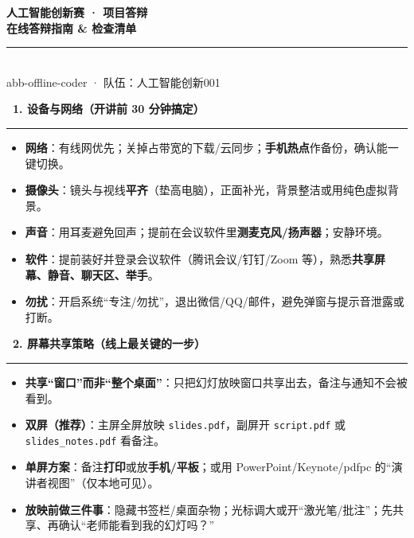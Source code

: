 \documentclass[a4paper,11pt,fontset=none]{ctexart}
\newcommand{\sect}[1]{\par\vspace{7pt}\noindent
  {\sffamily\bfseries\large\color{abbdark}\ding{110}\ #1}\\[-3pt]
  {\color{abbred}\rule{\linewidth}{0.8pt}}\par\vspace{3pt}}
\begin{document}
\thispagestyle{empty}  %

\vspace*{0.15cm}
\begin{center}
{\sffamily\bfseries\color{abbgray}\normalsize 人工智能创新赛 · 项目答辩}\\[3pt]
{\sffamily\Huge\bfseries\color{abbdark} 在线答辩指南 \& 检查清单}\\[3pt]
{\color{abbred}\rule{4.5cm}{1.6pt}}\\[4pt]
{\large abb-offline-coder · 队伍：人工智能创新001}
\end{center}
\vspace{2pt}

\noindent
{}

\sect{1. 设备与网络（开讲前 30 分钟搞定）}
\begin{itemize}
  \item \textbf{网络}：有线网优先；关掉占带宽的下载/云同步；\textbf{手机热点}作备份，确认能一键切换。
  \item \textbf{摄像头}：镜头与视线\textbf{平齐}（垫高电脑），正面补光，背景整洁或用纯色虚拟背景。
  \item \textbf{声音}：用耳麦避免回声；提前在会议软件里\textbf{测麦克风/扬声器}；安静环境。
  \item \textbf{软件}：提前装好并登录会议软件（腾讯会议/钉钉/Zoom 等），熟悉\textbf{共享屏幕、静音、聊天区、举手}。
  \item \textbf{勿扰}：开启系统“专注/勿扰”，退出微信/QQ/邮件，避免弹窗与提示音泄露或打断。
\end{itemize}

\sect{2. 屏幕共享策略（线上最关键的一步）}
\begin{itemize}
  \item \textbf{共享“窗口”而非“整个桌面”}：只把幻灯放映窗口共享出去，备注与通知不会被看到。
  \item \textbf{双屏（推荐）}：主屏全屏放映 \texttt{slides.pdf}，副屏开 \texttt{script.pdf} 或 \texttt{slides\_notes.pdf} 看备注。
  \item \textbf{单屏方案}：备注\textbf{打印}或放\textbf{手机/平板}；或用 PowerPoint/Keynote/pdfpc 的“演讲者视图”（仅本地可见）。
  \item \textbf{放映前做三件事}：隐藏书签栏/桌面杂物；光标调大或开“激光笔/批注”；先共享、再确认“老师能看到我的幻灯吗？”
\end{itemize}
\end{document}
